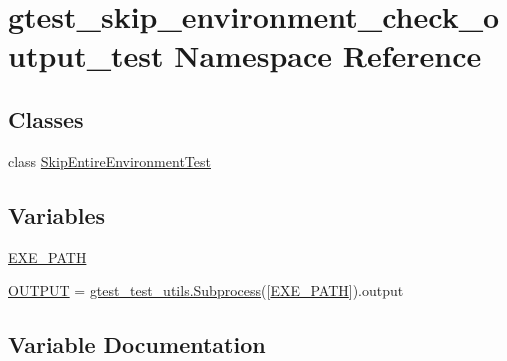 \hypertarget{namespacegtest__skip__environment__check__output__test}{}\section{gtest\+\_\+skip\+\_\+environment\+\_\+check\+\_\+output\+\_\+test Namespace Reference}
\label{namespacegtest__skip__environment__check__output__test}
\subsection*{Classes}
\begin{DoxyCompactItemize}
\item 
class \mbox{\hyperlink{classgtest__skip__environment__check__output__test_1_1_skip_entire_environment_test}{Skip\+Entire\+Environment\+Test}}
\end{DoxyCompactItemize}
\subsection*{Variables}
\begin{DoxyCompactItemize}
\item 
\mbox{\hyperlink{namespacegtest__skip__environment__check__output__test_ae1287ce2baf8d77448f38ca980c1b736}{E\+X\+E\+\_\+\+P\+A\+TH}}
\item 
\mbox{\hyperlink{namespacegtest__skip__environment__check__output__test_af9bbddca6e3449b9c998df24fbf081cf}{O\+U\+T\+P\+UT}} = \mbox{\hyperlink{classgtest__test__utils_1_1_subprocess}{gtest\+\_\+test\+\_\+utils.\+Subprocess}}(\mbox{[}\mbox{\hyperlink{namespacegtest__skip__environment__check__output__test_ae1287ce2baf8d77448f38ca980c1b736}{E\+X\+E\+\_\+\+P\+A\+TH}}\mbox{]}).output
\end{DoxyCompactItemize}


\subsection{Variable Documentation}
\mbox{\label{namespacegtest__skip__environment__check__output__test_ae1287ce2baf8d77448f38ca980c1b736}} 
